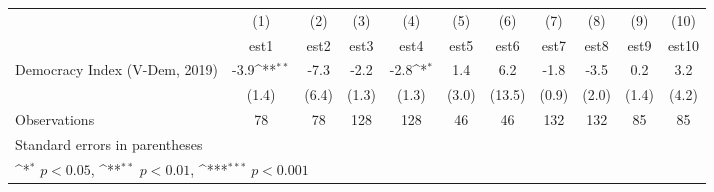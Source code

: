 {
\def\sym#1{\ifmmode^{#1}\else\(^{#1}\)\fi}
\begin{tabular}{l*{10}{c}}
\hline\hline
                    &\multicolumn{1}{c}{(1)}         &\multicolumn{1}{c}{(2)}         &\multicolumn{1}{c}{(3)}         &\multicolumn{1}{c}{(4)}         &\multicolumn{1}{c}{(5)}         &\multicolumn{1}{c}{(6)}         &\multicolumn{1}{c}{(7)}         &\multicolumn{1}{c}{(8)}         &\multicolumn{1}{c}{(9)}         &\multicolumn{1}{c}{(10)}         \\
                    &        est1         &        est2         &        est3         &        est4         &        est5         &        est6         &        est7         &        est8         &        est9         &       est10         \\
\hline
Democracy Index (V-Dem, 2019)&        -3.9\sym{**} &        -7.3         &        -2.2         &        -2.8\sym{*}  &         1.4         &         6.2         &        -1.8         &        -3.5         &         0.2         &         3.2         \\
                    &       (1.4)         &       (6.4)         &       (1.3)         &       (1.3)         &       (3.0)         &      (13.5)         &       (0.9)         &       (2.0)         &       (1.4)         &       (4.2)         \\
\hline
Observations        &          78         &          78         &         128         &         128         &          46         &          46         &         132         &         132         &          85         &          85         \\
\hline\hline
\multicolumn{11}{l}{\footnotesize Standard errors in parentheses}\\
\multicolumn{11}{l}{\footnotesize \sym{*} \(p<0.05\), \sym{**} \(p<0.01\), \sym{***} \(p<0.001\)}\\
\end{tabular}
}
